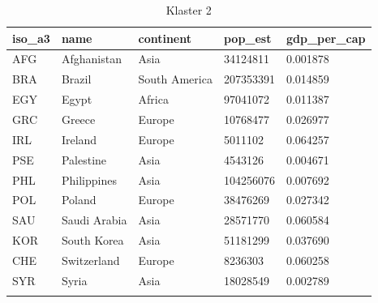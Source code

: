 \documentclass[11pt]{report}
\begin{document}
    \begin{table}[h!]
        \caption {Klaster 2} \label{tab:cl2}
        \begin{tabular}{lllll}
            \hline
            \multicolumn{1}{|l|}{iso\_a3} & \multicolumn{1}{l|}{name} & \multicolumn{1}{l|}{continent} & \multicolumn{1}{l|}{pop\_est} & \multicolumn{1}{l|}{gdp\_per\_cap} \\ \hline
            AFG                           & Afghanistan               & Asia                           & 34124811                      & 0.001878                           \\
            BRA                           & Brazil                    & South America                  & 207353391                     & 0.014859                           \\
            EGY                           & Egypt                     & Africa                         & 97041072                      & 0.011387                           \\
            GRC                           & Greece                    & Europe                         & 10768477                      & 0.026977                           \\
            IRL                           & Ireland                   & Europe                         & 5011102                       & 0.064257                           \\
            PSE                           & Palestine                 & Asia                           & 4543126                       & 0.004671                           \\
            PHL                           & Philippines               & Asia                           & 104256076                     & 0.007692                           \\
            POL                           & Poland                    & Europe                         & 38476269                      & 0.027342                           \\
            SAU                           & Saudi Arabia              & Asia                           & 28571770                      & 0.060584                           \\
            KOR                           & South Korea               & Asia                           & 51181299                      & 0.037690                           \\
            CHE                           & Switzerland               & Europe                         & 8236303                       & 0.060258                           \\
            SYR                           & Syria                     & Asia                           & 18028549                      & 0.002789                           \\
            &                           &                                &                               &
        \end{tabular}
    \end{table}
\end{document}
